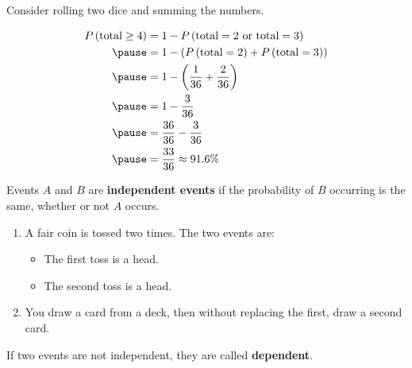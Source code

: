 \documentclass{beamer}
\newcommand{\prob}[1]{P\left(#1\right)}
\begin{document}
\begin{frame}
\begin{example}
Consider rolling two dice and summing the numbers.

\vspace{2mm}
\pause
{}\pause

\begin{equation*}
\begin{aligned}
\prob{\text{total} \geq 4} &= 1 - \prob{\text{total}=2~\text{or}~\text{total}=3} \\\pause
&= 1 - \left( \prob{\text{total}=2} + \prob{\text{total}=3}\right) \\\pause
&= 1 - \left(\dfrac{1}{36} + \dfrac{2}{36}\right) \\\pause
&= 1 - \dfrac{3}{36} \\\pause
&= \dfrac{36}{36} - \dfrac{3}{36} \\\pause
&= \dfrac{33}{36}\approx 91.6\%
\end{aligned}
\end{equation*}
\end{example}
\end{frame}

\begin{frame}
\begin{definition}
Events $A$ and $B$ are \textbf{independent events} if the probability of $B$ occurring is the same, whether or not $A$ occurs.
\end{definition}\pause

\begin{example}
\begin{enumerate}
\item A fair coin is tossed two times. The two events are:
\begin{itemize}
\item The first toss is a head.
\item The second toss is a head.
\end{itemize}\pause
{}\pause{}\pause
\item You draw a card from a deck, then without replacing the first, draw a second card.

\vspace{1mm}
\pause{}
\end{enumerate}
\end{example}\pause

\begin{note}
If two events are not independent, they are called \textbf{dependent}.
\end{note}
\end{frame}
\end{document}
